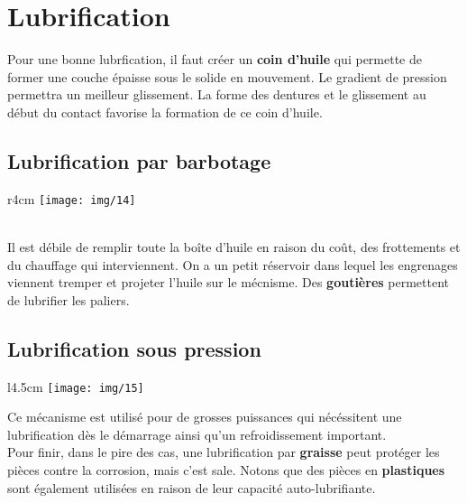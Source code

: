 \section{Lubrification}
\noindent Pour une bonne lubrfication, il faut créer un \textbf{coin d'huile} qui permette de former une couche épaisse sous le solide en mouvement. Le gradient de pression permettra un meilleur glissement. La forme des dentures et le glissement au début du contact favorise la formation de ce coin d'huile. 

\subsection{Lubrification par barbotage}
	\begin{wrapfigure}[5]{r}{4cm}
	\texttt{[image: img/14]}
	\end{wrapfigure}	
	\ \\ Il est débile de remplir toute la boîte d'huile en raison du coût, des frottements et du chauffage qui interviennent. On a un petit réservoir dans lequel les engrenages viennent tremper et projeter l'huile sur le mécnisme. Des \textbf{goutières} permettent de lubrifier les paliers. 
	
\subsection{Lubrification sous pression}
	\begin{wrapfigure}[7]{l}{4.5cm}
	\texttt{[image: img/15]}
	\end{wrapfigure}	
	\noindent Ce mécanisme est utilisé pour de grosses puissances qui nécéssitent une lubrification dès le démarrage ainsi qu'un refroidissement important. \\ Pour finir, dans le pire des cas, une lubrification par \textbf{graisse} peut protéger les pièces contre la corrosion, mais c'est sale. Notons que des pièces en \textbf{plastiques} sont également utilisées en raison de leur capacité auto-lubrifiante.